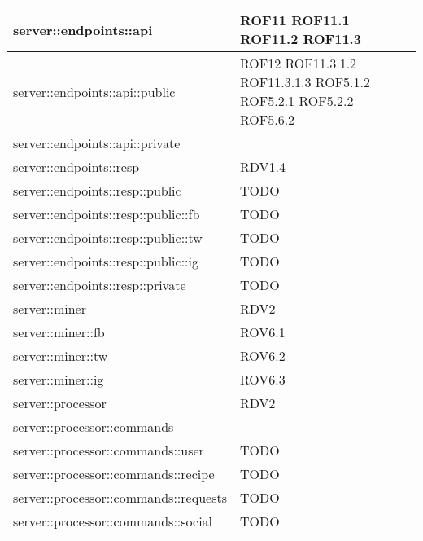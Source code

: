 \begin{center}
\begin{longtable}{| p{9cm} | p{4cm} |}
\hline
server::endpoints::api  &  ROF11 \newline ROF11.1 \newline ROF11.2 \newline ROF11.3 \\
\hline
server::endpoints::api::public  &  ROF12 \newline ROF11.3.1.2 \newline ROF11.3.1.3 \newline ROF5.1.2 \newline ROF5.2.1 \newline ROF5.2.2 \newline ROF5.6.2  \\
\hline
server::endpoints::api::private  &   \\
\hline
server::endpoints::resp  &  RDV1.4 \\
\hline
server::endpoints::resp::public  &  TODO \\
\hline
server::endpoints::resp::public::fb  &  TODO \\
\hline
server::endpoints::resp::public::tw  &  TODO \\
\hline
server::endpoints::resp::public::ig  &  TODO \\
\hline
server::endpoints::resp::private  &  TODO \\
\hline
server::miner  & RDV2 \\
\hline
server::miner::fb  &  ROV6.1 \\
\hline
server::miner::tw  &  ROV6.2 \\
\hline
server::miner::ig  &  ROV6.3 \\
\hline
server::processor  & RDV2 \\
\hline
server::processor::commands  &  \\
\hline
server::processor::commands::user  &  TODO \\
\hline
server::processor::commands::recipe  &  TODO \\
\hline
server::processor::commands::requests  &  TODO \\
\hline
server::processor::commands::social  &  TODO \\
\hline
\end{longtable}
\egroup
\end{center}
